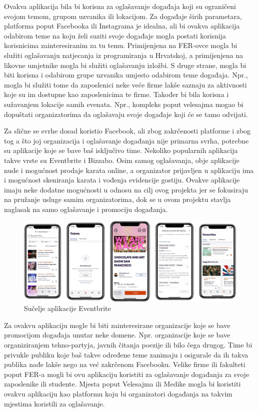 Ovakva aplikacija bila bi korisna za oglašavanje događaja koji su ograničeni svojom temom, grupom uzvanika ili lokacijom. Za događaje širih parametara, platforma poput Facebooka ili Instagrama je idealna, ali bi ovakva aplikacija odabirom teme na koju želi suziti svoje događaje mogla postati korisnija korisnicima zainteresiranim za tu temu. Primijenjena na FER-ovce mogla bi služiti oglašavanju natjecanja iz programiranja u Hrvatskoj, a primijenjena na likovne umjetnike mogla bi služiti oglašavanju izložbi. S druge strane, mogla bi biti korisna i odabirom grupe uzvanika umjesto odabirom teme događaja. Npr., mogla bi služiti tome da zaposlenici neke veće firme lakše saznaju za aktivnosti koje su im dostupne kao zaposlenicima te firme. Također bi bila korisna i sužavanjem lokacije samih evenata. Npr., kompleks poput velesajma mogao bi dopuštati organizatorima da oglašavaju svoje događaje koji će se tamo odvijati.

Za slične se svrhe dosad koristio Facebook, ali zbog zakrčenosti platforme i zbog tog a što joj organizacija i oglašavanje događanja nije primarna svrha, potrebne su aplikacije koje se bave baš isključivo time. Nekoliko popularnih aplikacija takve vrste su Eventbrite i Bizzabo. Osim samog oglašavanja, obje aplikacije nude i mogućnost prodaje karata online, a organizator prijavljen u aplikaciju ima i mogućnost skeniranja karata i vođenja evidencije gostiju. Ovakve aplikacije imaju neke dodatne mogućnosti u odnosu na cilj ovog projekta jer se fokusiraju na pružanje usluge samim organizatorima, dok se u ovom projektu stavlja naglasak na samo oglašavanje i promociju događanja.


		\begin{figure}[H]
			\includegraphics[scale=0.2]{slike/eventbrite.jpg} %
			\centering
			\caption{Sučelje aplikacije Eventbrite}
			\label{fig:eventBrite}
		\end{figure}


Za ovakvu aplikaciju mogle bi biti zainteresirane organizacije koje se bave promocijom događaja unutar neke domene. Npr. organizacije koje se bave organiziranjem tehno-partyja, javnih čitanja poezije ili bilo čega drugog. Time bi privukle publiku  koje baš takve određene teme zanimaju i osigurale da ih takva publika nađe lakše nego na već zakrčenom Facebooku. Velike firme ili fakulteti poput FER-a mogli bi ovu aplikaciju koristiti za oglašavanje događanja za svoje zaposlenike ili studente. Mjesta poput Velesajma ili Medike mogla bi koristiti ovakvu aplikaciju kao platformu koju bi organizatori događanja na takvim mjestima koristili za oglašavanje.

